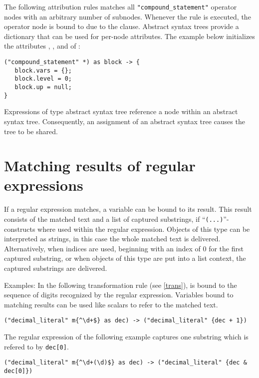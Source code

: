 \noindent
The following attribution rules matches all \lstinline!"compound_statement"!
operator nodes with an arbitrary number of subnodes. Whenever the rule
is executed, the operator node is bound to  due to the
 clause. Abstract syntax trees provide a dictionary that
can be used for per-node attributes. The example below initializes the
attributes , , and  of :

\begin{lstlisting}
("compound_statement" *) as block -> {
   block.vars = {};
   block.level = 0;
   block.up = null;
}
\end{lstlisting}

\noindent
Expressions of type abstract syntax tree reference a node within an
abstract syntax tree. Consequently, an assignment of an abstract syntax
tree causes the tree to be shared.

\section{Matching results of regular expressions}\label{matchresult}

If a regular expression matches, a variable can be bound to its
result. This result consists of the matched text and a list
of captured substrings, if ``\lstinline!(...)!''-constructs
where used within the regular expression. Objects of this
type can be interpreted as strings, in this case the whole
matched text is delivered. Alternatively, when indices are
used, beginning with an index of 0 for the first captured substring,
or when objects of this type are put into a list context,
the captured substrings are delivered.

Examples: In the following transformation rule
(see \ref{trans}),
 is bound to the sequence of digits recognized by the
regular expression. Variables bound to matching results can be
used like scalars to refer to the matched text.

\begin{lstlisting}
("decimal_literal" m{^\d+$} as dec) -> ("decimal_literal" {dec + 1})
\end{lstlisting}%

\noindent
The regular expression of the following example 
captures one substring which is refered to by \lstinline!dec[0]!.

\begin{lstlisting}
("decimal_literal" m{^\d+(\d)$} as dec) -> ("decimal_literal" {dec & dec[0]})
\end{lstlisting}%


